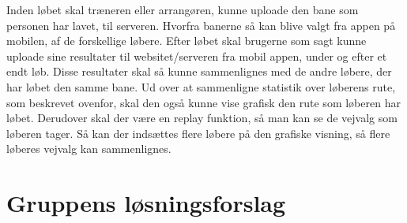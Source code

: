 Inden løbet skal træneren eller arrangøren, kunne uploade den bane som personen har lavet, til serveren. Hvorfra banerne så kan blive valgt fra appen på mobilen, af de forskellige løbere. Efter løbet skal brugerne som sagt kunne uploade sine resultater til websitet/serveren fra mobil appen, under og efter et endt løb. Disse resultater skal så kunne sammenlignes med de andre løbere, der har løbet den samme bane. Ud over at sammenligne statistik over løberens rute, som beskrevet ovenfor, skal den også kunne vise grafisk den rute som løberen har løbet. Derudover skal der være en replay funktion, så man kan se de vejvalg som løberen tager. Så kan der indsættes flere løbere på den grafiske visning, så flere løberes vejvalg kan sammenlignes.

\section{Gruppens løsningsforslag}

